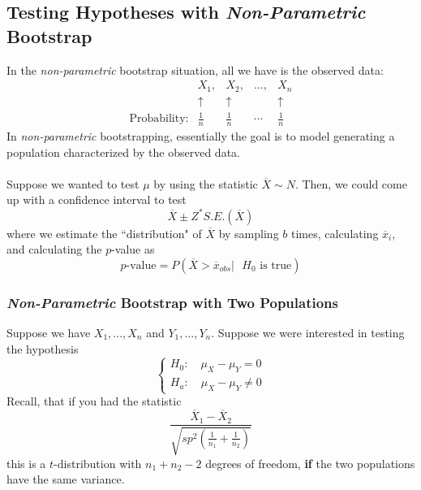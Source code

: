 \documentclass{article}
\begin{document}
\subsection{Testing Hypotheses with \textit{Non-Parametric} Bootstrap}

In the \textit{non-parametric} bootstrap situation, all we have is the observed data:
\begin{equation*}
    \begin{matrix}
        & X_1, & X_2, & \dots ,& X_n\\
        & \uparrow & \uparrow & & \uparrow\\
    \text{Probability:}    & \frac{1}{n} & \frac{1}{n} & \cdots & \frac{1}{n}
    \end{matrix}
\end{equation*}
In \textit{non-parametric} bootstrapping, essentially the goal is to model generating a population characterized by the observed data.
\\~\\
Suppose we wanted to test $\mu$ by using the statistic $\overline{X}\sim N$. Then, we could come up with a confidence interval to test
\begin{equation*}
    \overline{X} \pm Z^* S.E.\left(\overline{X}\right)
\end{equation*}
where we estimate the ``distribution" of $\overline{X}$ by sampling $b$ times, calculating $\overline{x}_i$, and calculating the $p$-value as
\begin{equation*}
    p\text{-value} = P(\overline{X} > \overline{x}_{obs} | \text{ $H_0$ is true})
\end{equation*}

\subsubsection{\textit{Non-Parametric} Bootstrap with Two Populations}

Suppose we have $X_1,...,X_n$ and $Y_1,...,Y_n$. Suppose we were interested in testing the hypothesis
\begin{equation*}
    \begin{cases}
        H_0: \quad \mu_X - \mu_Y = 0\\
        H_a: \quad \mu_X - \mu_Y \neq 0
    \end{cases}
\end{equation*}
Recall, that if you had the statistic
\begin{equation*}
    \frac{\overline{X}_1 - \overline{X}_2}{\sqrt{sp^2\left(\frac{1}{n_1} + \frac{1}{n_2}\right)}}
\end{equation*}
this is a $t$-distribution with $n_1 + n_2 - 2$ degrees of freedom, \textbf{if} the two populations have the same variance.
\end{document}
